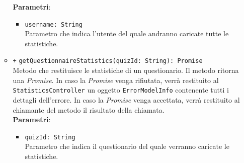 \begin{itemize}
\begin{itemize}
	    \textbf{Parametri}:
		\begin{itemize}
			\item \texttt{username: String} \\ Parametro che indica l'utente del quale andranno caricate tutte le statistiche.
		\end{itemize}
		\item \texttt{+} \texttt{getQuestionnaireStatistics(quizId: String): Promise} \\Metodo che restituisce le statistiche di un questionario.  Il metodo ritorna una \textit{Promise}. In caso la \textit{Promise} venga rifiutata, verrà restituito al \texttt{StatisticsController} un oggetto \texttt{ErrorModelInfo} contenente tutti i dettagli dell'errore. In caso la \textit{Promise} venga accettata, verrà restituito al chiamante del metodo il risultato della chiamata.\\
		\textbf{Parametri}:
		\begin{itemize}
			\item \texttt{quizId: String} \\ Parametro che indica il questionario del quale verranno caricate le statistiche.
		\end{itemize}
	\end{itemize}
\end{itemize}